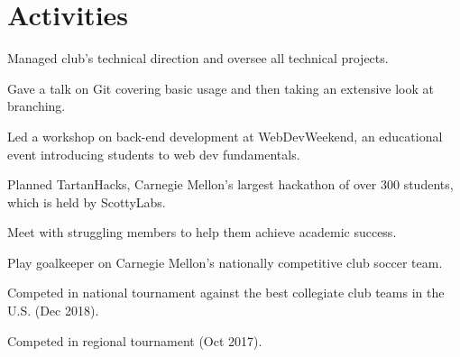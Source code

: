 \documentclass[]{openfont}
\begin{document}
\begin{minipage}[t]{0.60\textwidth}
\sectionsep


\section{Activities} 
\begin{tightemize}
    \item Managed club's technical direction and oversee all technical projects.
    \item Gave a talk on Git covering basic usage and then taking an extensive
        look at branching.
    \item Led a workshop on back-end development at WebDevWeekend, an
        educational event introducing students to web dev fundamentals.
    \item Planned TartanHacks, Carnegie Mellon's largest hackathon of over 300 students, which is held by ScottyLabs.
\end{tightemize}

\sectionsep

\begin{tightemize}
    \item Meet with struggling members to help them achieve academic success.
\end{tightemize}

\sectionsep

\begin{tightemize}
    \item Play goalkeeper on Carnegie Mellon's nationally competitive club soccer team.
    \item Competed in national tournament against the best collegiate club teams
        in the U.S. (Dec 2018).
    \item Competed in regional tournament (Oct 2017).
\end{tightemize}

\sectionsep

\end{minipage} 
\end{document}
